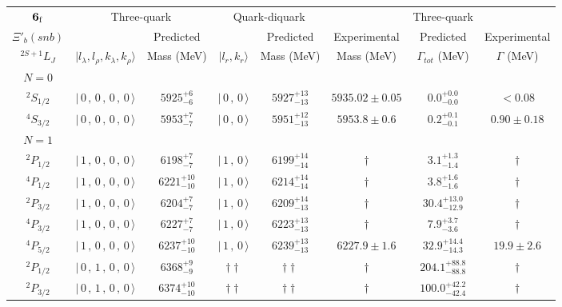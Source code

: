 \begin{tabular}{c| c c c c c c c}\hline \hline
${\bf {6}}_{\rm f}$ & \multicolumn{2}{c}{Three-quark} &  \multicolumn{2}{c}{Quark-diquark}   &    &  Three-quark  &\\ 
$\Xi'_{b}(snb)$ &   & Predicted  &   &  Predicted   &  Experimental &  Predicted            & Experimental \\ 
 $^{2S+1}L_{J}$ & $\vert l_{\lambda}, l_{\rho}, k_{\lambda}, k_{\rho} \rangle$ & Mass (MeV)  & $\vert l_{r}, k_{r} \rangle$  &  Mass (MeV)   &  Mass (MeV)   &  $\Gamma_{tot}$ (MeV) & $\Gamma$ (MeV) \\ \hline
\hline
 $N=0$  &  &  &  &  &  \\ 
$^{2}S_{1/2}$ & $\vert \,0\,,\,0\,,\,0\,,\,0 \,\rangle $ & $5925^{+6}_{-6}$ & $\vert \,0\,,\,0 \,\rangle$ & $5927^{+13}_{-13}$ & $5935.02\pm 0.05$ & $0.0^{+0.0}_{-0.0}$ & $<0.08$ \\ 
$^{4}S_{3/2}$ & $\vert \,0\,,\,0\,,\,0\,,\,0 \,\rangle $ & $5953^{+7}_{-7}$ & $\vert \,0\,,\,0 \,\rangle$ & $5951^{+12}_{-13}$ & $5953.8\pm 0.6$ & $0.2^{+0.1}_{-0.1}$ & $0.90\pm 0.18$ \\ 
\hline
 $N=1$  &  &  &  &  &  \\ 
$^{2}P_{1/2}$ & $\vert \,1\,,\,0\,,\,0\,,\,0 \,\rangle $ & $6198^{+7}_{-7}$ & $\vert \,1\,,\,0 \,\rangle$ & $6199^{+14}_{-14}$ & $\dagger$ & $3.1^{+1.3}_{-1.4}$ & $\dagger$ \\ 
$^{4}P_{1/2}$ & $\vert \,1\,,\,0\,,\,0\,,\,0 \,\rangle $ & $6221^{+10}_{-10}$ & $\vert \,1\,,\,0 \,\rangle$ & $6214^{+14}_{-14}$ & $\dagger$ & $3.8^{+1.6}_{-1.6}$ & $\dagger$ \\ 
$^{2}P_{3/2}$ & $\vert \,1\,,\,0\,,\,0\,,\,0 \,\rangle $ & $6204^{+7}_{-7}$ & $\vert \,1\,,\,0 \,\rangle$ & $6209^{+14}_{-13}$ & $\dagger$ & $30.4^{+13.0}_{-12.9}$ & $\dagger$ \\ 
$^{4}P_{3/2}$ & $\vert \,1\,,\,0\,,\,0\,,\,0 \,\rangle $ & $6227^{+7}_{-7}$ & $\vert \,1\,,\,0 \,\rangle$ & $6223^{+13}_{-13}$ & $\dagger$ & $7.9^{+3.7}_{-3.6}$ & $\dagger$ \\ 
$^{4}P_{5/2}$ & $\vert \,1\,,\,0\,,\,0\,,\,0 \,\rangle $ & $6237^{+10}_{-10}$ & $\vert \,1\,,\,0 \,\rangle$ & $6239^{+13}_{-13}$ & $6227.9\pm 1.6$ & $32.9^{+14.4}_{-14.3}$ & $19.9\pm 2.6$ \\ 
$^{2}P_{1/2}$ & $\vert \,0\,,\,1\,,\,0\,,\,0 \,\rangle $ & $6368^{+9}_{-9}$ & $\dagger\dagger$ & $\dagger\dagger$ & $\dagger$ & $204.1^{+88.8}_{-88.8}$ & $\dagger$ \\ 
$^{2}P_{3/2}$ & $\vert \,0\,,\,1\,,\,0\,,\,0 \,\rangle $ & $6374^{+10}_{-10}$ & $\dagger\dagger$ & $\dagger\dagger$ & $\dagger$ & $100.0^{+42.2}_{-42.4}$ & $\dagger$ \\ 

\end{tabular}
